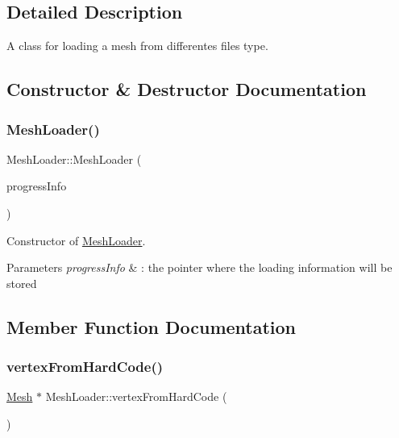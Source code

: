 \subsection{Detailed Description}
A class for loading a mesh from differentes files type. 

\subsection{Constructor \& Destructor Documentation}
\mbox{\label{class_mesh_loader_aa7c21b2f7397722bf822110594c6dea8}} 
\subsubsection{\texorpdfstring{Mesh\+Loader()}{MeshLoader()}}
{\footnotesize\ttfamily Mesh\+Loader\+::\+Mesh\+Loader (\begin{DoxyParamCaption}\item[{\mbox{\hyperlink{class_progress_info}{Progress\+Info}} $\ast$}]{progress\+Info }\end{DoxyParamCaption})}



Constructor of \mbox{\hyperlink{class_mesh_loader}{Mesh\+Loader}}. 


\begin{DoxyParams}{Parameters}
{\em progress\+Info} & \+: the pointer where the loading information will be stored \\
\hline
\end{DoxyParams}


\subsection{Member Function Documentation}
\mbox{\label{class_mesh_loader_a5cb576ef3e8a00523eda848adf534536}} 
\subsubsection{\texorpdfstring{vertex\+From\+Hard\+Code()}{vertexFromHardCode()}}
{\footnotesize\ttfamily \mbox{\hyperlink{class_mesh}{Mesh}} $\ast$ Mesh\+Loader\+::vertex\+From\+Hard\+Code (\begin{DoxyParamCaption}{ }\end{DoxyParamCaption})}



